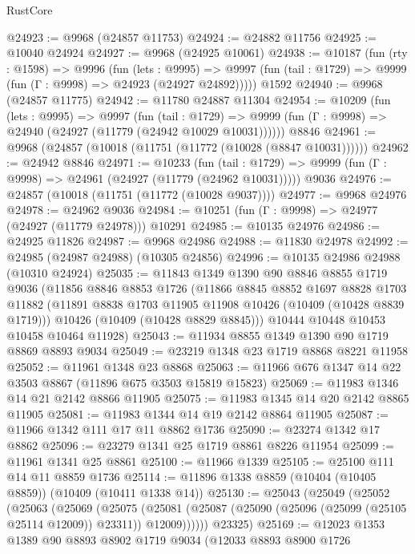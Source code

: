 \begin{lexlean}{RustCore}
\begin{coremodule}
@24923 := @9968 (@24857 @11753)
@24924 := @24882 @11756
@24925 := @10040 @24924
@24927 := @9968 (@24925 @10061)
@24938 := @10187
    (fun (rty : @1598) =>
    @9996
      (fun (lets : @9995) =>
      @9997 (fun (tail : @1729) => @9999 (fun (Γ : @9998) => @24923 (@24927 @24892)))))
    @1592
@24940 := @9968 (@24857 @11775)
@24942 := @11780 @24887 @11304
@24954 := @10209
    (fun (lets : @9995) =>
    @9997
      (fun (tail : @1729) =>
      @9999 (fun (Γ : @9998) => @24940 (@24927 (@11779 (@24942 @10029 @10031))))))
    @8846
@24961 := @9968 (@24857 (@10018 (@11751 (@11772 (@10028 (@8847 @10031))))))
@24962 := @24942 @8846
@24971 := @10233
    (fun (tail : @1729) => @9999 (fun (Γ : @9998) => @24961 (@24927 (@11779 (@24962 @10031)))))
    @9036
@24976 := @24857 (@10018 (@11751 (@11772 (@10028 @9037))))
@24977 := @9968 @24976
@24978 := @24962 @9036
@24984 := @10251 (fun (Γ : @9998) => @24977 (@24927 (@11779 @24978))) @10291
@24985 := @10135 @24976
@24986 := @24925 @11826
@24987 := @9968 @24986
@24988 := @11830 @24978
@24992 := @24985 (@24987 @24988) (@10305 @24856)
@24996 := @10135 @24986 @24988 (@10310 @24924)
@25035 := @11843
    @1349
    @1390
    @90
    @8846
    @8855
    @1719
    @9036
    (@11856
      @8846
      @8853
      @1726
      (@11866
        @8845
        @8852
        @1697
        @8828
        @1703
        @11882
        (@11891 @8838 @1703 @11905 @11908 @10426 (@10409 (@10428 @8839 @1719)))
        @10426
        (@10409 (@10428 @8829 @8845)))
      @10444
      @10448
      @10453
      @10458
      @10464
      @11928)
@25043 := @11934 @8855 @1349 @1390 @90 @1719 @8869 @8893 @9034
@25049 := @23219 @1348 @23 @1719 @8868 @8221 @11958
@25052 := @11961 @1348 @23 @8868
@25063 := @11966 @676 @1347 @14 @22 @3503 @8867 (@11896 @675 @3503 @15819 @15823)
@25069 := @11983 @1346 @14 @21 @2142 @8866 @11905
@25075 := @11983 @1345 @14 @20 @2142 @8865 @11905
@25081 := @11983 @1344 @14 @19 @2142 @8864 @11905
@25087 := @11966 @1342 @111 @17 @11 @8862 @1736
@25090 := @23274 @1342 @17 @8862
@25096 := @23279 @1341 @25 @1719 @8861 @8226 @11954
@25099 := @11961 @1341 @25 @8861
@25100 := @11966 @1339
@25105 := @25100 @111 @14 @11 @8859 @1736
@25114 := @11896 @1338 @8859 (@10404 (@10405 @8859)) (@10409 (@10411 @1338 @14))
@25130 := @25043
    (@25049
      (@25052
        (@25063
          (@25069
            (@25075
              (@25081 (@25087 (@25090 (@25096 (@25099 (@25105 @25114 @12009)) @23311)) @12009))))))
      @23325)
@25169 := @12023
    @1353
    @1389
    @90
    @8893
    @8902
    @1719
    @9034
    (@12033
      @8893
      @8900
      @1726

\end{coremodule}
\end{lexlean}
